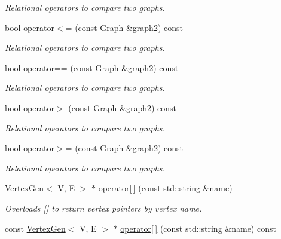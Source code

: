 \begin{DoxyCompactItemize}
\begin{DoxyCompactList}\small\item\em Relational operators to compare two graphs. \end{DoxyCompactList}\item 
bool \mbox{\hyperlink{classGraph_a352607f2b21dd87b3d2a3957bbf3da7b}{operator$<$=}} (const \mbox{\hyperlink{classGraph}{Graph}} \&graph2) const
\begin{DoxyCompactList}\small\item\em Relational operators to compare two graphs. \end{DoxyCompactList}\item 
bool \mbox{\hyperlink{classGraph_a188f85939e3fe6ed2d411f622287f722}{operator==}} (const \mbox{\hyperlink{classGraph}{Graph}} \&graph2) const
\begin{DoxyCompactList}\small\item\em Relational operators to compare two graphs. \end{DoxyCompactList}\item 
bool \mbox{\hyperlink{classGraph_a8019cf2c98949fd509193cf26ba2ff8a}{operator$>$}} (const \mbox{\hyperlink{classGraph}{Graph}} \&graph2) const
\begin{DoxyCompactList}\small\item\em Relational operators to compare two graphs. \end{DoxyCompactList}\item 
bool \mbox{\hyperlink{classGraph_ab1ca2af20f3b0251972b72295270212e}{operator$>$=}} (const \mbox{\hyperlink{classGraph}{Graph}} \&graph2) const
\begin{DoxyCompactList}\small\item\em Relational operators to compare two graphs. \end{DoxyCompactList}\item 
\mbox{\hyperlink{classVertexGen}{Vertex\+Gen}}$<$ V, E $>$ $\ast$ \mbox{\hyperlink{classBasicGraphGen_a5e874dbb2f9f2c7f98ec74f00790eb0e}{operator\mbox{[}$\,$\mbox{]}}} (const std\+::string \&name)
\begin{DoxyCompactList}\small\item\em Overloads {\ttfamily \mbox{[}\mbox{]}} to return vertex pointers by vertex name. \end{DoxyCompactList}\item 
const \mbox{\hyperlink{classVertexGen}{Vertex\+Gen}}$<$ V, E $>$ $\ast$ \mbox{\hyperlink{classBasicGraphGen_ad91a5b6ebd034841cf4f4c410fb7ed1b}{operator\mbox{[}$\,$\mbox{]}}} (const std\+::string \&name) const

\end{DoxyCompactItemize}
